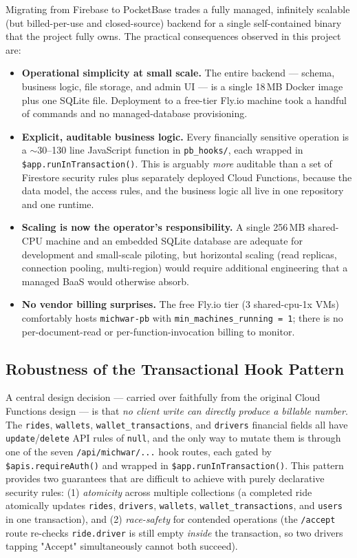 \documentclass[11pt,a4paper]{article}
\begin{document}
Migrating from Firebase to PocketBase trades a fully managed, infinitely
scalable (but billed-per-use and closed-source) backend for a single
self-contained binary that the project fully owns. The practical
consequences observed in this project are:

\begin{itemize}[nosep]
  \item \textbf{Operational simplicity at small scale.} The entire backend
    --- schema, business logic, file storage, and admin UI --- is a single
    18\,MB Docker image plus one SQLite file. Deployment to a free-tier
    Fly.io machine took a handful of commands and no managed-database
    provisioning.
  \item \textbf{Explicit, auditable business logic.} Every financially
    sensitive operation is a $\sim$30--130 line JavaScript function in
    \texttt{pb\_hooks/}, each wrapped in \texttt{\$app.runInTransaction()}. This
    is arguably \textit{more} auditable than a set of Firestore security
    rules plus separately deployed Cloud Functions, because the data model,
    the access rules, and the business logic all live in one repository and
    one runtime.
  \item \textbf{Scaling is now the operator's responsibility.} A single
    256\,MB shared-CPU machine and an embedded SQLite database are adequate
    for development and small-scale piloting, but horizontal scaling
    (read replicas, connection pooling, multi-region) would require
    additional engineering that a managed BaaS would otherwise absorb.
  \item \textbf{No vendor billing surprises.} The free Fly.io tier (3
    shared-cpu-1x VMs) comfortably hosts \texttt{michwar-pb} with
    \texttt{min\_machines\_running = 1}; there is no per-document-read or
    per-function-invocation billing to monitor.
\end{itemize}

\subsection{Robustness of the Transactional Hook Pattern}

A central design decision --- carried over faithfully from the original
Cloud Functions design --- is that \textit{no client write can directly
produce a billable number}. The \texttt{rides}, \texttt{wallets},
\texttt{wallet\_transactions}, and \texttt{drivers} financial fields all have
\texttt{update}/\texttt{delete} API rules of \texttt{null}, and the only way to
mutate them is through one of the seven \texttt{/api/michwar/...} hook routes,
each gated by \texttt{\$apis.requireAuth()} and wrapped in
\texttt{\$app.runInTransaction()}. This pattern provides two guarantees that
are difficult to achieve with purely declarative security rules: (1)
\textit{atomicity} across multiple collections (a completed ride atomically
updates \texttt{rides}, \texttt{drivers}, \texttt{wallets},
\texttt{wallet\_transactions}, and \texttt{users} in one transaction), and (2)
\textit{race-safety} for contended operations (the \texttt{/accept} route
re-checks \texttt{ride.driver} is still empty \textit{inside} the transaction,
so two drivers tapping "Accept" simultaneously cannot both succeed).
\end{document}
